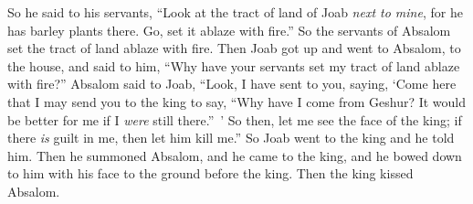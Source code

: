 \begin{biblechapter}
\verse So he said to his servants, “Look at the tract of land of Joab \textit{next to mine}, for he has barley plants there. Go, set it ablaze with fire.” So the servants of Absalom set the tract of land ablaze with fire.
\verse Then Joab got up and went to Absalom, to the house, and said to him, “Why have your servants set my tract of land ablaze with fire?”
\verse Absalom said to Joab, “Look, I have sent to you, saying, ‘Come here that I may send you to the king to say, “Why have I come from Geshur? It would be better for me if I \textit{were} still there.” ’ So then, let me see the face of the king; if there \textit{is} guilt in me, then let him kill me.”
\verse So Joab went to the king and he told him. Then he summoned Absalom, and he came to the king, and he bowed down to him with his face to the ground before the king. Then the king kissed Absalom.
\end{biblechapter}

